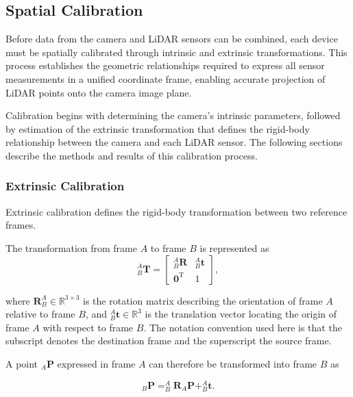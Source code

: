 \documentclass[../main.tex]{subfiles}
\begin{document}
\subsection{Spatial Calibration} \label{spatial_calibration}

Before data from the camera and \ac{LiDAR} sensors can be combined, each device must be spatially calibrated through intrinsic and extrinsic transformations.  
This process establishes the geometric relationships required to express all sensor measurements in a unified coordinate frame, enabling accurate projection of \ac{LiDAR} points onto the camera image plane.

Calibration begins with determining the camera’s intrinsic parameters, followed by estimation of the extrinsic transformation that defines the rigid-body relationship between the camera and each \ac{LiDAR} sensor.  
The following sections describe the methods and results of this calibration process.

\subsubsection{Extrinsic Calibration} \label{extrinsic_tform}

Extrinsic calibration defines the rigid-body transformation between two reference frames.  

The transformation from frame $A$ to frame $B$ is represented as
\begin{equation}
    _{B}^{A}\mathbf{T} =
    \begin{bmatrix}
        _{B}^{A}\mathbf{R} & _{B}^{A}\mathbf{t} \\
        \mathbf{0}^\mathrm{T} & 1
    \end{bmatrix},
\end{equation}

where $\mathbf{R}_{B}^{A} \in \mathbb{R}^{3\times3}$ is the rotation matrix describing the orientation of frame $A$ relative to frame $B$, and $_{B}^{A}\mathbf{t} \in \mathbb{R}^{3}$ is the translation vector locating the origin of frame $A$ with respect to frame $B$.  
The notation convention used here is that the subscript denotes the destination frame and the superscript the source frame.

A point $_{A}\mathbf{P}$ expressed in frame $A$ can therefore be transformed into frame $B$ as

\begin{equation}
    _{B}\mathbf{P} =
    _{B}^{A}\mathbf{R} _{A}\mathbf{P} + _{B}^{A}\mathbf{t}.
\end{equation}
\end{document}
